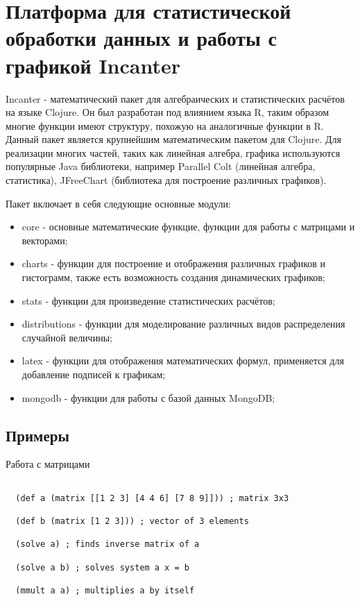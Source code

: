 \section{Платформа для статистической обработки данных и работы с графикой Incanter}

Incanter - математический пакет для алгебраических и статистических расчётов на языке Clojure. Он был разработан под влиянием языка R, таким образом многие функции имеют структуру, похожую на аналогичные функции в R. Данный пакет является крупнейшим математическим пакетом для Clojure. Для реализации многих частей, таких как линейная алгебра, графика используются популярные Java библиотеки, например Parallel Colt (линейная алгебра, статистика), JFreeChart (библиотека для построение различных графиков).

Пакет включает в себя следующие основные модули:

\begin{itemize}
\item core - основные математические функцие, функции для работы с матрицами и векторами;

\item charts - функции для построение и отображения различных графиков и гистограмм, также есть возможность создания динамических графиков;

\item stats - функции для произведение статистических расчётов;

\item distributions - функции для моделирование различных видов распределения случайной величины;

\item latex - функции для отображения математических формул, применяется для добавление подписей к графикам;

\item mongodb - функции для работы с базой данных MongoDB;
\end{itemize}

\subsection{Примеры}

Работа с матрицами

\begin{verbatim}

  (def a (matrix [[1 2 3] [4 4 6] [7 8 9]])) ; matrix 3x3

  (def b (matrix [1 2 3])) ; vector of 3 elements

  (solve a) ; finds inverse matrix of a

  (solve a b) ; solves system a x = b

  (mmult a a) ; multiplies a by itself

\end{verbatim}

